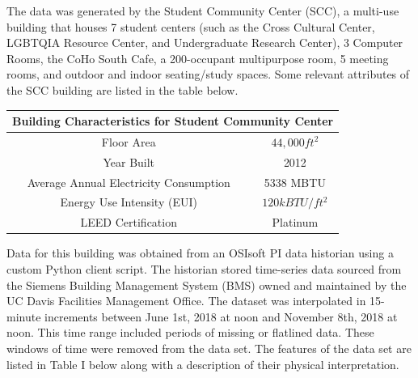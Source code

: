 \documentclass[letterpaper, 12 pt, conference]{ieeeconf}  %
\begin{document}
The data was generated by the Student Community Center (SCC), a multi-use building that houses 7 student centers (such as the Cross Cultural Center, LGBTQIA Resource Center, and Undergraduate Research Center), 3 Computer Rooms, the CoHo South Cafe, a 200-occupant multipurpose room, 5 meeting rooms, and outdoor and indoor seating/study spaces. Some relevant attributes of the SCC building are listed in the table below. 

\begin{table}[H]
        \centering
        \begin{tabular}{cc}
        \toprule
        \multicolumn{2}{c}{Building Characteristics for Student Community Center}
        \\ \midrule
        Floor Area                             & $44,000ft^2$    \\
        Year Built                             & 2012            \\
        Average Annual Electricity Consumption & 5338 MBTU       \\
        Energy Use Intensity (EUI)             & $120 kBTU/ft^2$ \\ 
        LEED Certification                     & Platinum        \\
        \bottomrule
        \end{tabular}
\end{table}

Data for this building was obtained from an OSIsoft PI data historian using a custom Python client script. The historian stored time-series data sourced from the Siemens Building Management System (BMS) owned and maintained by the UC Davis Facilities Management Office. The dataset was interpolated in 15-minute increments between June 1st, 2018 at noon and November 8th, 2018 at noon. This time range included periods of missing or flatlined data. These windows of time were removed from the data set. The features of the data set are listed in Table I below along with a description of their physical interpretation.

\end{document}
